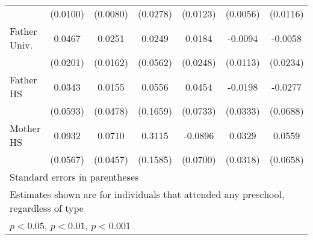 \begin{table}[htbp]
\begin{tabular}{l*{6}{c}}
            &    (0.0100)         &    (0.0080)         &    (0.0278)         &    (0.0123)         &    (0.0056)         &    (0.0116)         \\
\addlinespace
Father Univ.&      0.0467\sym{*}  &      0.0251         &      0.0249         &      0.0184         &     -0.0094         &     -0.0058         \\
            &    (0.0201)         &    (0.0162)         &    (0.0562)         &    (0.0248)         &    (0.0113)         &    (0.0234)         \\
\addlinespace
Father HS   &      0.0343         &      0.0155         &      0.0556         &      0.0454         &     -0.0198         &     -0.0277         \\
            &    (0.0593)         &    (0.0478)         &    (0.1659)         &    (0.0733)         &    (0.0333)         &    (0.0688)         \\
\addlinespace
Mother HS   &      0.0932         &      0.0710         &      0.3115\sym{*}  &     -0.0896         &      0.0329         &      0.0559         \\
            &    (0.0567)         &    (0.0457)         &    (0.1585)         &    (0.0700)         &    (0.0318)         &    (0.0658)         \\
\bottomrule
\multicolumn{7}{l}{\footnotesize Standard errors in parentheses}\\
\multicolumn{7}{l}{\footnotesize Estimates shown are for individuals that attended any preschool, regardless of type}\\
\multicolumn{7}{l}{\footnotesize \sym{*} \(p<0.05\), \sym{**} \(p<0.01\), \sym{***} \(p<0.001\)}\\
\end{tabular}
\end{table}

